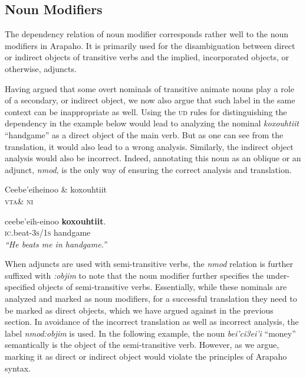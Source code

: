 \documentclass[11pt]{article}
\begin{document}
\subsection{Noun Modifiers}
The dependency relation of noun modifier corresponds rather well to the noun modifiers in Arapaho. It is primarily used for the disambiguation between direct or indirect objects of transitive verbs and the implied, incorporated objects, or otherwise, adjuncts.

Having argued that some overt nominals of transitive animate nouns play a role of a secondary, or indirect object, we now also  argue that such label in the same context can be inappropriate as well. Using the \textsc{ud} rules for distinguishing the dependency in the example below would lead to analyzing the nominal \textit{koxouhtiit} ``handgame'' as a direct object of the main verb. But as one can see from the translation, it would also lead to a wrong analysis. Similarly, the indirect object analysis would also be incorrect. Indeed, annotating this noun as an oblique or an adjunct, \textit{nmod}, is the only way of ensuring the correct analysis and translation. 

\small
\begin{exe}
\ex \label{handgame} 
\begin{dependency}
\begin{deptext}
Ceebe'eiheinoo \& koxouhtiit\\
\textsc{vta}\& \textsc{ni}\\
\end{deptext}
\end{dependency}
\gll ceebe'eih-einoo \textbf{koxouhtiit}.\\
\textsc{ic}.beat-\textsc{3s/1s} handgame\\
\trans \textit{``He beats me in handgame.''}
\end{exe}
\normalsize
When adjuncts are used with semi-transitive verbs, the \textit{nmod} relation is further suffixed with \textit{:objim} to note that the noun modifier further specifies the under-specified objects  of semi-transitive verbs. Essentially, while these nominals are analyzed and marked as noun modifiers, for a successful translation they need to be marked as direct objects, which we have argued against in the previous section. In avoidance of the incorrect translation as well as incorrect analysis, the label \textit{nmod:objim} is used. In the following example, the noun \textit{bei'ci3ei'i} ``money'' semantically is the object of the semi-transitive verb. However, as we argue, marking it as direct or indirect object would violate the principles of Arapaho syntax.
\end{document}

